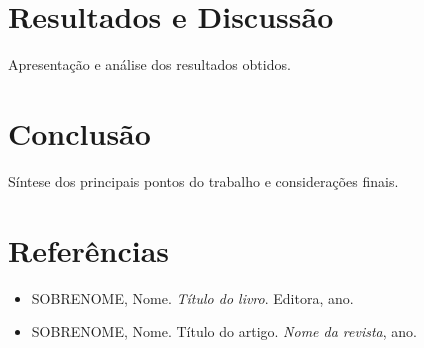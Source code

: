 \documentclass[12pt,a4paper]{article}
\begin{document}
\section{Resultados e Discussão}

Apresentação e análise dos resultados obtidos.

\section{Conclusão}

Síntese dos principais pontos do trabalho e considerações finais.

\newpage
\section*{Referências}

\begin{itemize}
    \item SOBRENOME, Nome. \textit{Título do livro}. Editora, ano.
    \item SOBRENOME, Nome. Título do artigo. \textit{Nome da revista}, ano.
\end{itemize}
\end{document}
